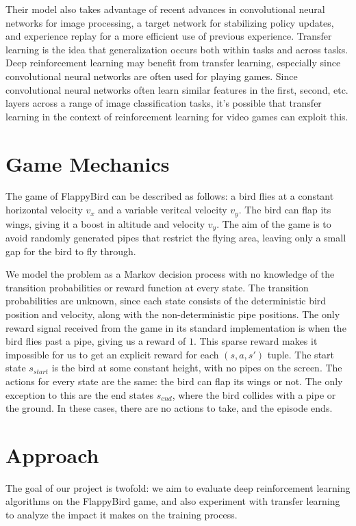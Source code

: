\documentclass{article}
\begin{document}
Their model also takes advantage of recent advances in convolutional neural networks for image processing, a target network for stabilizing policy updates, and experience replay for a more efficient use of previous experience.
Transfer learning is the idea that generalization occurs both within tasks and across tasks. \cite{transfer}
Deep reinforcement learning may benefit from transfer learning, especially since convolutional neural networks are often used for playing games.
Since convolutional neural networks often learn similar features in the first, second, etc. layers across a range of image classification tasks, it's possible that transfer learning in the context of reinforcement learning for video games can exploit this.

\section{Game Mechanics}

The game of FlappyBird can be described as follows: a bird flies at a constant horizontal velocity $v_x$ and a variable veritcal velocity $v_y$. 
The bird can flap its wings, giving it a boost in altitude and velocity $v_y$.
The aim of the game is to avoid randomly generated pipes that restrict the flying area, leaving only a small gap for the bird to fly through. 

We model the problem as a Markov decision process with no knowledge of the transition probabilities or reward function at every state.
The transition probabilities are unknown, since each state consists of the deterministic bird position and velocity, along with the non-deterministic pipe positions.
The only reward signal received from the game in its standard implementation is when the bird flies past a pipe, giving us a reward of $1$. 
This sparse reward makes it impossible for us to get an explicit reward for each $(s, a, s')$ tuple.
The start state $s_{start}$ is the bird at some constant height, with no pipes on the screen.
The actions for every state are the same: the bird can flap its wings or not.
The only exception to this are the end states $s_{end}$, where the bird collides with a pipe or the ground.
In these cases, there are no actions to take, and the episode ends.

\section{Approach}

The goal of our project is twofold: we aim to evaluate deep reinforcement learning algorithms on the FlappyBird game, and also experiment with transfer learning to analyze the impact it makes on the training process. 
\end{document}
